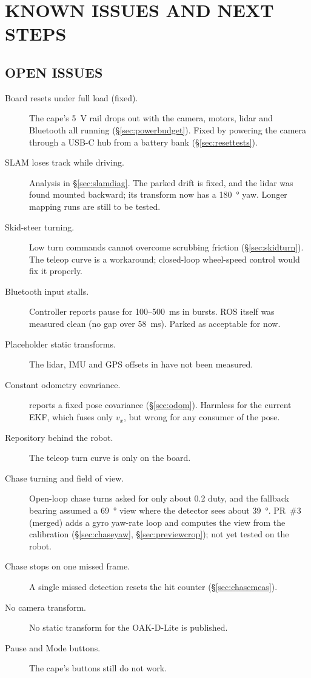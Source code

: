 \chapter{KNOWN ISSUES AND NEXT STEPS}
\label{ch:issues}

\section{OPEN ISSUES}

\begin{description}
\item[Board resets under full load (fixed).] The cape's \SI{5}{V} rail drops out with
  the camera, motors, lidar and Bluetooth all running (\S\ref{sec:powerbudget}).
  Fixed by powering the camera through a USB-C hub from a battery bank
  (\S\ref{sec:resettests}).
\item[SLAM loses track while driving.] Analysis in \S\ref{sec:slamdiag}. The
  parked drift is fixed, and the lidar was found mounted backward; its
  transform now has a \SI{180}{\degree} yaw. Longer mapping runs are still to be tested.
\item[Skid-steer turning.] Low turn commands cannot overcome scrubbing friction
  (\S\ref{sec:skidturn}). The teleop curve is a workaround; closed-loop
  wheel-speed control would fix it properly.
\item[Bluetooth input stalls.] Controller reports pause for 100--500~ms in
  bursts. ROS itself was measured clean (no  gap over
  \SI{58}{ms}). Parked as acceptable for now.
\item[Placeholder static transforms.] The lidar, IMU and GPS offsets in
   have not been measured.
\item[Constant odometry covariance.]  reports a fixed pose
  covariance (\S\ref{sec:odom}). Harmless for the current EKF, which fuses
  only $v_x$, but wrong for any consumer of the pose.
\item[Repository behind the robot.] The teleop turn curve is only on the
  board.
\item[Chase turning and field of view.] Open-loop chase turns asked for
  only about 0.2 duty, and the fallback bearing assumed a \SI{69}{\degree}
  view where the detector sees about \SI{39}{\degree}. PR~\#3 (merged) adds a gyro
  yaw-rate loop and computes the view from the calibration
  (\S\ref{sec:chaseyaw}, \S\ref{sec:previewcrop}); not yet tested on the
  robot.
\item[Chase stops on one missed frame.] A single missed detection resets the
  hit counter (\S\ref{sec:chasemeas}).
\item[No camera transform.] No static transform for the OAK-D-Lite is
  published.
\item[Pause and Mode buttons.] The cape's buttons still do not work.
\end{description}

